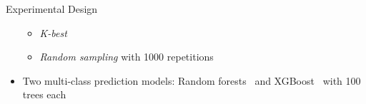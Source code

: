 \documentclass[en]{sdqbeamer}
\begin{document}
\begin{frame}[t]{Experimental Design}
\begin{itemize}
\begin{itemize}
			\item \emph{K-best}
			\item \emph{Random sampling} with 1000 repetitions
		\end{itemize}
		\pause
		\vspace{\baselineskip}
		\item Two multi-class prediction models: Random forests~\cite{breiman2001random, scikit-learn} and XGBoost~\cite{xgboost} with 100 trees each
	\end{itemize}
\end{frame}
\end{document}
